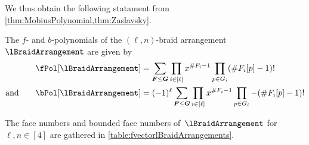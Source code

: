 We thus obtain the following statament from \cref{thm:MobiusPolynomial,thm:Zaslavsky}.

\begin{corollary}
\label{coro:fbvectorslBraidArrangement}
The $f$- and $b$-polynomials of the $(\ell,n)$-braid arrangement~$\lBraidArrangement$ are given by
\begin{align*}
\fPol[\lBraidArrangement] & = \sum_{\b{F} \le \b{G}} \prod_{i \in [\ell]} x^{\#F_i-1} \prod_{p \in G_i} (\# F_i[p]-1)!\\
\text{and}\qquad
\bPol[\lBraidArrangement] & = (-1)^\ell \sum_{\b{F} \le \b{G}} \prod_{i \in [\ell]} x^{\#F_i-1} \prod_{p \in G_i} -(\# F_i[p]-1)!
\end{align*}
\end{corollary}

The face numbers and bounded face numbers of~$\lBraidArrangement$ for~$\ell, n \in [4]$ are gathered in \cref{table:fvectorlBraidArrangements}.

